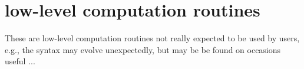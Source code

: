\hypertarget{group__matmap__group21}{\section{low-\/level computation routines}
\label{group__matmap__group21}
}
These are low-\/level computation routines not really expected to be used by users, e.\-g., the syntax may evolve unexpectedly, but may be be found on occasions useful ... 